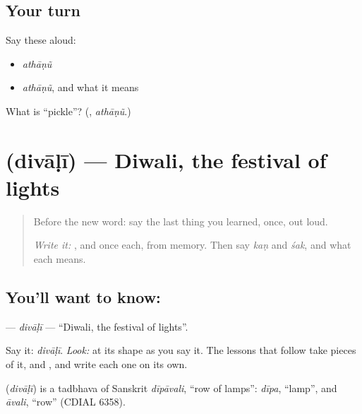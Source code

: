\subsection*{Your turn}
Say these aloud:

\begin{itemize}
\raggedright
  \item \emph{athāṇũ}
  \item \emph{athāṇũ}, and what it means
\end{itemize}

\begin{tcolorbox}[breakable,colback=teal!4,colframe=teal!35!black,title={Before you move on}]
What is \textquotedblleft{}pickle\textquotedblright{}? (\textbf{}, \emph{athāṇũ}.)
\end{tcolorbox}
\section[\texorpdfstring{\gu{દિવાળી} (divāḷī)}{દિવાળી (divāḷī)}]{ (divāḷī) — Diwali, the festival of lights}

\label{lesson:GU-C04-divaali}



\begin{quote}
Before the new word: say the last thing you learned, once, out loud.

\emph{Write it:} \textbf{}, \textbf{} and \textbf{} once each, from memory. Then say \emph{kaṇ} and \emph{śak}, and what each means.
\end{quote}

\subsection*{You'll want to know: }
\textbf{} — \emph{divāḷī} — \textquotedblleft{}Diwali, the festival of lights\textquotedblright{}.

Say it: \emph{divāḷī}. \emph{Look:} at its shape as you say it. The lessons that follow take pieces of it, \textbf{} and \textbf{}, and write each one on its own.

\begin{cousinweb}
\textbf{} (\emph{divāḷī}) is a tadbhava of Sanskrit \emph{dīpāvali}, \textquotedblleft{}row of lamps\textquotedblright{}: \emph{dīpa}, \textquotedblleft{}lamp\textquotedblright{}, and \emph{āvali}, \textquotedblleft{}row\textquotedblright{} (CDIAL 6358).
\end{cousinweb}

